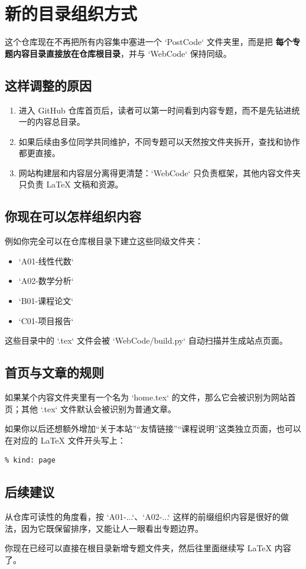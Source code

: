 
\section{新的目录组织方式}

这个仓库现在不再把所有内容集中塞进一个 `PostCode` 文件夹里，而是把 \textbf{每个专题内容目录直接放在仓库根目录}，并与 `WebCode` 保持同级。

\tableofcontents

\subsection{这样调整的原因}

\begin{enumerate}
\item 进入 GitHub 仓库首页后，读者可以第一时间看到内容专题，而不是先钻进统一的内容总目录。
\item 如果后续由多位同学共同维护，不同专题可以天然按文件夹拆开，查找和协作都更直接。
\item 网站构建层和内容层分离得更清楚：`WebCode` 只负责框架，其他内容文件夹只负责 LaTeX 文稿和资源。
\end{enumerate}

\subsection{你现在可以怎样组织内容}

例如你完全可以在仓库根目录下建立这些同级文件夹：

\begin{itemize}
\item `A01-线性代数`
\item `A02-数学分析`
\item `B01-课程论文`
\item `C01-项目报告`
\end{itemize}

这些目录中的 `.tex` 文件会被 `WebCode/build.py` 自动扫描并生成站点页面。

\subsection{首页与文章的规则}

\begin{definition}
如果某个内容文件夹里有一个名为 `home.tex` 的文件，那么它会被识别为网站首页；其他 `.tex` 文件默认会被识别为普通文章。
\end{definition}

如果你以后还想额外增加“关于本站”“友情链接”“课程说明”这类独立页面，也可以在对应的 LaTeX 文件开头写上：

\begin{verbatim}
% kind: page
\end{verbatim}

\subsection{后续建议}

\begin{remark}
从仓库可读性的角度看，按 `A01-...`、`A02-...` 这样的前缀组织内容是很好的做法，因为它既保留排序，又能让人一眼看出专题边界。
\end{remark}

你现在已经可以直接在根目录新增专题文件夹，然后往里面继续写 LaTeX 内容了。
